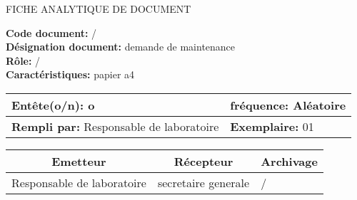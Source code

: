 

\newpage

\begin{center}
\Huge FICHE ANALYTIQUE DE DOCUMENT
\end{center}

\vspace{0.5cm}
    

\begin{flushleft}
\textbf{Code document:} / \\
\textbf{Désignation document:} demande de maintenance \\
\textbf{Rôle:} / \\
\textbf{Caractéristiques:} papier a4 \\
\end{flushleft}

\vspace{1cm}

\begin{table}[ht]
\begin{tabularx}{\textwidth}{|X|X|}

\hline
\textbf{Entête(o/n):}  o   & \textbf{fréquence:} Aléatoire  \\
\hline
\textbf{Rempli par:}  Responsable de laboratoire & \textbf{Exemplaire:} 01  \\
\hline
\end{tabularx}
\end{table}

\vspace{1cm}

\begin{table}[ht]
\begin{tabularx}{\textwidth}{|X|X|X|}
  \hline
  \multicolumn{1}{|c|}{\centering\textbf{Emetteur}} & \multicolumn{1}{c|}{\centering\textbf{Récepteur}} & \multicolumn{1}{c|}{\centering\textbf{Archivage}} \\
  \hline
  Responsable de laboratoire & secretaire generale  & / \\
  \hline
  
 
\end{tabularx}
\end{table}

\vspace{1cm}

